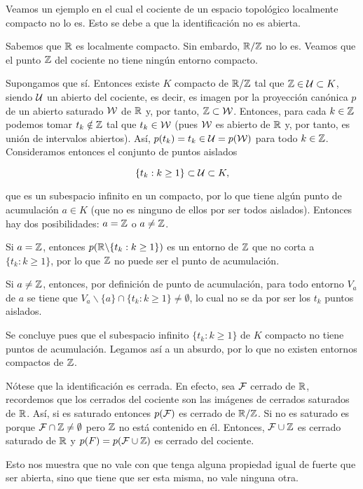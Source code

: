 \begin{exa}\label{T6:exa_comportamiento_local_compacidad_cociente}
	Veamos un ejemplo en el cual el cociente de un espacio topológico localmente compacto no lo es. Esto se debe a que la identificación no es abierta.
	
	Sabemos que $\mathbb{R}$ es localmente compacto. Sin embardo, $\mathbb{R}/\mathbb{Z}$ no lo es. Veamos que el punto $\mathbb{Z}$ del cociente no tiene ningún entorno compacto.
	
	Supongamos que sí. Entonces existe $K$ compacto de $\mathbb{R}/\mathbb{Z}$ tal que $\mathbb{Z}\in\mathcal{U}\subset K$, siendo $\mathcal{U}$ un abierto del cociente, es decir, es imagen por la proyección canónica $p$ de un abierto saturado $\mathcal{W}$ de $\mathbb{R}$ y, por tanto, $\mathbb{Z}\subset\mathcal{W}$. Entonces, para cada $k\in\mathbb{Z}$ podemos tomar $t_k\notin\mathbb{Z}$ tal que $t_k\in\mathcal{W}$ (pues $\mathcal{W}$ es abierto de $\mathbb{R}$ y, por tanto, es unión de intervalos abiertos). Así, $p(t_k)=t_k\in\mathcal{U}=p(\mathcal{W})$ para todo $k\in\mathbb{Z}$. Consideramos entonces el conjunto de puntos aislados
	
	\[\{t_k : k\ge 1\}\subset\mathcal{U}\subset K,\]
	
	que es un subespacio infinito en un compacto, por lo que tiene algún punto de acumulación $a\in K$ (que no es ninguno de ellos por ser todos aislados). Entonces hay dos posibilidades: $a=\mathbb{Z}$ o $a\not=\mathbb{Z}$.
	
	Si $a=\mathbb{Z}$, entonces $p(\mathbb{R}\backslash\{t_k:k\ge 1\})$ es un entorno de $\mathbb{Z}$ que no corta a $\{t_k : k\ge 1\}$, por lo que $\mathbb{Z}$ no puede ser el punto de acumulación.
	
	Si $a\not=\mathbb{Z}$, entonces, por definición de punto de acumulación, para todo entorno $V_a$ de $a$ se tiene que $V_a\backslash\{a\}\cap \{t_k : k\ge 1\}\not=\emptyset$, lo cual no se da por ser los $t_k$ puntos aislados.
	
	Se concluye pues que el subespacio infinito $\{t_k : k\ge 1\}$ de $K$ compacto no tiene puntos de acumulación. Legamos así a un absurdo, por lo que no existen entornos compactos de $\mathbb{Z}$.
	
	Nótese que la identificación es cerrada. En efecto, sea $\mathcal{F}$ cerrado de $\mathbb{R}$, recordemos que los cerrados del cociente son las imágenes de cerrados saturados de $\mathbb{R}$. Así, si es saturado entonces $p(\mathcal{F})$ es cerrado de $\mathbb{R}/\mathbb{Z}$. Si no es saturado es porque $\mathcal{F}\cap\mathbb{Z}\not=\emptyset$ pero $\mathbb{Z}$ no está contenido en él. Entonces, $\mathcal{F}\cup\mathbb{Z}$ es cerrado saturado de $\mathbb{R}$ y $p(F)=p(\mathcal{F}\cup\mathbb{Z})$ es cerrado del cociente.
	
	Esto nos muestra que no vale con que tenga alguna propiedad igual de fuerte que ser abierta, sino que tiene que ser esta misma, no vale ninguna otra.
\end{exa}

